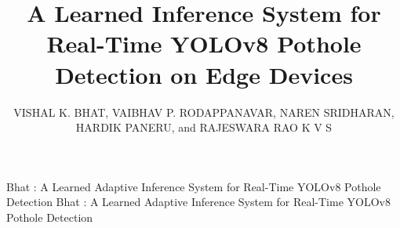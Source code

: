\documentclass{ieeeaccess}
\begin{document}

\title{A Learned  Inference System for Real-Time YOLOv8 Pothole Detection on Edge Devices}

\author{
\uppercase{Vishal K. Bhat},
\uppercase{Vaibhav P. Rodappanavar},
\uppercase{Naren Sridharan},
\uppercase{Hardik Paneru}, and
\uppercase{Rajeswara Rao K V S}}

\address[1]{Department of Computer Science, RV College of Engineering, Bengaluru, Karnataka 560059, India (e-mail: vishalkbhat.cs23@rvce.edu.in; vaibhavpr.cs23@rvce.edu.in)}
\address[2]{Department of Electronics and Communication Engineering, RV College of Engineering, Bengaluru, Karnataka 560059, India (e-mail: narensridharan.ec23@rvce.edu.in; hardikpaneru.ec23@rvce.edu.in)}
\address[3]{Department of Industrial Engineering \& Management, RV College of Engineering, Bengaluru, Karnataka 560059, India (e-mail: rajeswararaokvs@rvce.edu.in)}


\markboth
{Bhat \headeretal: A Learned Adaptive Inference System for Real-Time YOLOv8 Pothole Detection}
{Bhat \headeretal: A Learned Adaptive Inference System for Real-Time YOLOv8 Pothole Detection}

\end{document}
